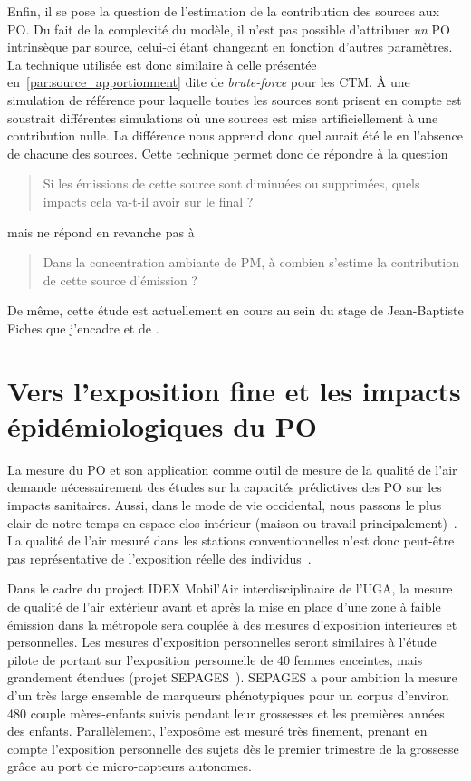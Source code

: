 Enfin, il se pose la question de l'estimation de la contribution des sources aux PO. Du
fait de la complexité du modèle, il n'est pas possible d'attribuer \emph{un} PO
intrinsèque par source, celui-ci étant changeant en fonction d'autres paramètres.
La technique utilisée est donc similaire à celle présentée
en~\ref{par:source_apportionment} dite de \textit{brute-force} pour les CTM. À une
simulation de référence pour laquelle toutes les sources sont prisent en compte est
soustrait différentes simulations où une sources est mise artificiellement à une
contribution nulle.  La différence nous apprend donc quel aurait été le \POv{} en
l'absence de chacune des sources.
Cette technique permet donc de répondre à la question
\begin{quote}
   Si les émissions de cette source sont diminuées ou supprimées, quels impacts cela va-t-il
   avoir sur le \POv{} final ?
\end{quote}
mais ne répond en revanche pas à
\begin{quote}
   Dans la concentration ambiante de PM, à combien s'estime la contribution de cette source
   d'émission ?
\end{quote}

De même, cette étude est actuellement en cours au sein du stage de Jean-Baptiste Fiches
que j'encadre et de \cite{borlazaUrbaninprep.}.

\section{Vers l'exposition fine et les impacts épidémiologiques du PO}

La mesure du PO et son application comme outil de mesure de la qualité de l'air demande
nécessairement des études sur la capacités prédictives des PO sur les impacts sanitaires.
Aussi, dans le mode de vie occidental, nous passons le plus clair de notre temps en espace
clos intérieur (maison ou travail
principalement)~\autocite{netheryTime2009,ouidirEstimation2015}. La qualité de l'air
mesuré dans les stations conventionnelles n'est donc peut-être pas représentative de
l'exposition réelle des individus~\autocite{sauvainOxidative2015}.

Dans le cadre du project IDEX Mobil'Air interdisciplinaire de l'UGA, la mesure de qualité
de l'air extérieur avant et après la mise en place d'une zone à faible émission dans la
métropole sera couplée à des mesures d'exposition interieures et personnelles. Les mesures
d'exposition personnelles seront similaires à l'étude pilote de \cite{ouidirEstimation2015}
portant sur l'exposition personnelle de 40 femmes enceintes, mais grandement étendues (projet
SEPAGES~\autocite{lyon-caenDeciphering2019}). SEPAGES a pour ambition la mesure d'un très large
ensemble de marqueurs phénotypiques pour un corpus d'environ 480 couple mères-enfants
suivis pendant leur grossesses et les premières années des enfants. Parallèlement,
l'exposôme est mesuré très finement, prenant en compte l'exposition personnelle des
sujets dès le premier trimestre de la grossesse grâce au port de micro-capteurs autonomes.


